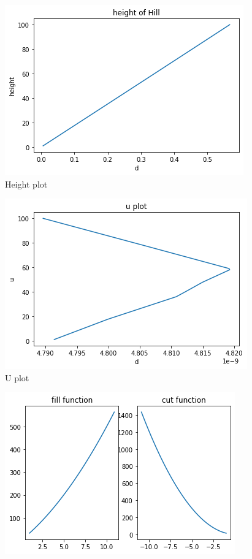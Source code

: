 \documentclass[journal,12pt,twocolumn]{IEEEtran}
\begin{document}
\begin{enumerate}
\begin{figure}[H]
    \includegraphics[width=\columnwidth]{h.png}
    \caption{Height plot}
    \label{}
\end{figure}
\begin{figure}[H]
	\centering
    \includegraphics[width=\columnwidth]{u.png}
    \caption{U plot}
    \label{}
\end{figure}
\begin{figure}[H]
	\centering
    \includegraphics[width=\columnwidth]{fc.png}

\end{figure}
\end{enumerate}
\end{document}
